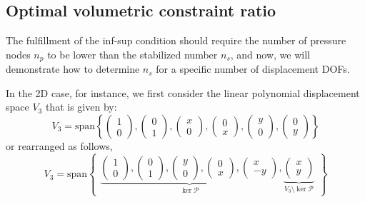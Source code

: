 \subsection{Optimal volumetric constraint ratio}
The fulfillment of the inf-sup condition should require the number of pressure nodes $n_p$ to be lower than the stabilized number $n_s$, and now, we will demonstrate how to determine $n_s$ for a specific number of displacement DOFs.

In the 2D case, for instance, we first consider the linear polynomial displacement space $V_3$ that is given by:
\begin{equation}
V_3 = \mathrm{span} \left\{
\begin{pmatrix} 1 \\ 0 \end{pmatrix},
\begin{pmatrix} 0 \\ 1 \end{pmatrix},
\begin{pmatrix} x \\ 0 \end{pmatrix},
\begin{pmatrix} 0 \\ x \end{pmatrix},
\begin{pmatrix} y \\ 0 \end{pmatrix},
\begin{pmatrix} 0 \\ y \end{pmatrix}
\right\}
\end{equation}
or rearranged as follows,
\begin{equation}\label{base1}
V_3 = \mathrm{span}
\begin{Bmatrix}
\underbrace{
\begin{pmatrix} 1 \\ 0 \end{pmatrix},
\begin{pmatrix} 0 \\ 1 \end{pmatrix},
\begin{pmatrix} y \\ 0 \end{pmatrix},
\begin{pmatrix} 0 \\ x \end{pmatrix},
\begin{pmatrix} x \\ -y \end{pmatrix}
}_{\ker \mathcal{P}},
\underbrace{
\begin{pmatrix} x \\ y \end{pmatrix}
}_{V_3 \setminus \ker \mathcal{P}}
\end{Bmatrix}
\end{equation}
